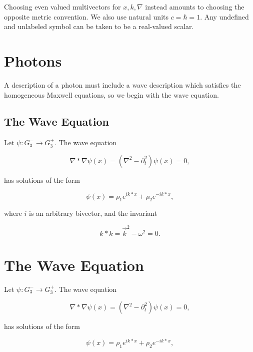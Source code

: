 \documentclass{birkjour}
\begin{document}
Choosing even valued multivectors for $x, k, \nabla$ instead amounts to choosing the opposite metric convention. We also use natural units $c = \hbar = 1$. Any undefined and unlabeled symbol can be taken to be a real-valued scalar.

\section{Photons}

A description of a photon must include a wave description which satisfies the homogeneous Maxwell equations, so we begin with the wave equation.

\subsection{The Wave Equation}

Let $\psi : G_3^- \to G_3^+$. The wave equation

\begin{equation}
  \nabla * \nabla \psi(x) = (\nabla^2 - \partial_t^2) \psi(x) = 0,
\end{equation}

has solutions of the form

\begin{equation}
  \psi(x) = \rho_1 e^{i k * x} + \rho_2 e^{-i k * x}, \label{eq:super}
\end{equation}

where $i$ is an arbitrary bivector, and the invariant

\begin{equation}
  k*k = \vec k^2 - \omega^2 = 0.
\end{equation}

\section{The Wave Equation}

Let $\psi : G_3^- \to G_3^+$. The wave equation

\begin{equation}
  \nabla * \nabla \psi(x) = (\nabla^2 - \partial_t^2) \psi(x) = 0,
\end{equation}

has solutions of the form

\begin{equation}
  \psi(x) = \rho_1 e^{i k * x} + \rho_2 e^{-i k * x}, \label{eq:super}
\end{equation}
\end{document}
